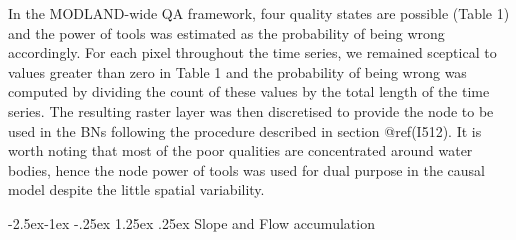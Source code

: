 \documentclass[12pt,oneside]{article}
\makeatletter
\renewcommand\paragraph{\@startsection{paragraph}{4}{\z@}%
            {-2.5ex\@plus -1ex \@minus -.25ex}%
            {1.25ex \@plus .25ex}%
            {\normalfont\normalsize\bfseries}}
\makeatother
\begin{document}
In the MODLAND-wide QA framework, four quality states are possible (Table 1) and the power of tools was estimated as the probability of being wrong accordingly. For each pixel throughout the time series, we remained sceptical to values greater than zero in Table 1 and the probability of being wrong was computed by dividing the count of these values by the total length of the time series. The resulting raster layer was then discretised to provide the node to be used in the BNs following the procedure described in section @ref(I512). It is worth noting that most of the poor qualities are concentrated around water bodies, hence the node power of tools was used for dual purpose in the causal model despite the little spatial variability.

\hypertarget{I526}{%
\paragraph{Slope and Flow accumulation}\label{I526}}
\end{document}

